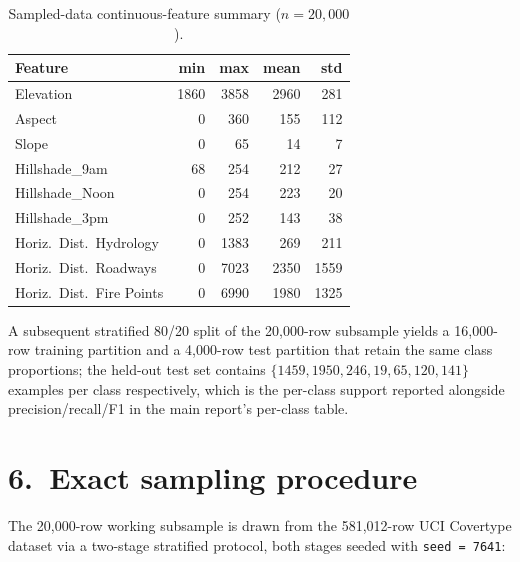 \documentclass[11pt]{article}
\begin{document}
\begin{table}[h]\centering
\caption{Sampled-data continuous-feature summary ($n{=}20{,}000$).}
\begin{tabularx}{0.95\linewidth}{Xrrrr}
\toprule
\textcolor{denimdark}{\textbf{Feature}} & \textbf{min} & \textbf{max} & \textbf{mean} & \textbf{std} \\
\midrule
Elevation                   & 1860 & 3858 & 2960 & 281 \\
Aspect                      &    0 &  360 &  155 & 112 \\
Slope                       &    0 &   65 &   14 &   7 \\
Hillshade\_9am              &   68 &  254 &  212 &  27 \\
Hillshade\_Noon             &    0 &  254 &  223 &  20 \\
Hillshade\_3pm              &    0 &  252 &  143 &  38 \\
Horiz.\ Dist.\ Hydrology    &    0 & 1383 &  269 & 211 \\
Horiz.\ Dist.\ Roadways     &    0 & 7023 & 2350 & 1559 \\
Horiz.\ Dist.\ Fire Points  &    0 & 6990 & 1980 & 1325 \\
\bottomrule
\end{tabularx}
\end{table}

A subsequent stratified 80/20 split of the 20{,}000-row subsample yields a
16{,}000-row training partition and a 4{,}000-row test partition that retain
the same class proportions; the held-out test set contains
$\{1459, 1950, 246, 19, 65, 120, 141\}$ examples per class respectively,
which is the per-class support reported alongside precision/recall/F1 in
the main report's per-class table.

\section*{6.\ Exact sampling procedure}

The 20{,}000-row working subsample is drawn from the 581{,}012-row UCI
Covertype dataset via a two-stage stratified protocol, both stages seeded
with \texttt{seed = 7641}:

\end{document}
